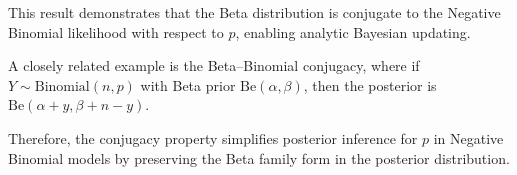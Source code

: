 This result demonstrates that the Beta distribution is conjugate to the Negative Binomial likelihood with respect to \(p\), enabling analytic Bayesian updating.

A closely related example is the Beta–Binomial conjugacy, where if \(Y \sim \text{Binomial}(n, p)\) with Beta prior \(\text{Be}(\alpha, \beta)\), then the posterior is \(\text{Be}(\alpha + y, \beta + n - y)\).

Therefore, the conjugacy property simplifies posterior inference for \(p\) in Negative Binomial models by preserving the Beta family form in the posterior distribution.
















